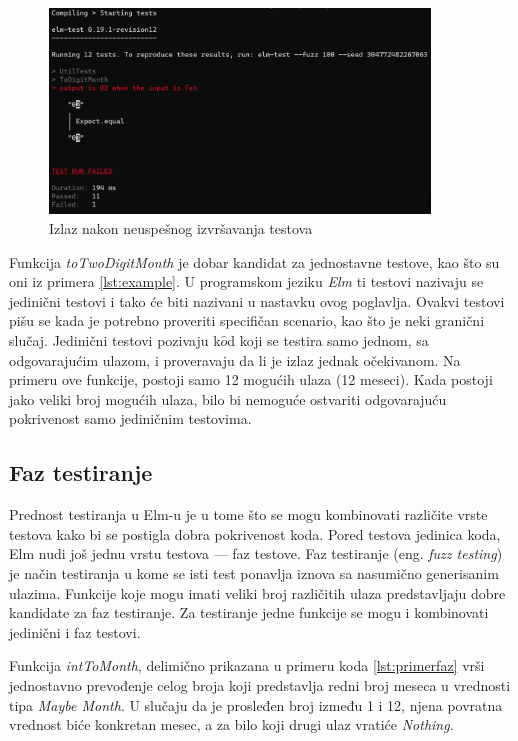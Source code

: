 \documentclass[12pt,oneside]{memoir}
\begin{document}
\begin{figure}[!ht]
  \centering
  \includegraphics[width=0.9\textwidth]{elmfail.png}
  \caption{Izlaz nakon neuspešnog izvršavanja testova}
  \label{fig:elmfail}
\end{figure}

\par Funkcija \emph{toTwoDigitMonth} je dobar kandidat za jednostavne testove, kao što su oni iz primera \ref{lst:example}. U programskom jeziku \emph{Elm} ti testovi nazivaju se jedinični testovi i tako će biti nazivani u nastavku ovog poglavlja. Ovakvi testovi pišu se kada je potrebno proveriti specifičan scenario, kao što je neki granični slučaj. Jedinični testovi pozivaju k$\hat{o}$d koji se testira samo jednom, sa odgovarajućim ulazom, i proveravaju da li je izlaz jednak očekivanom. Na primeru ove funkcije, postoji samo 12 mogućih ulaza (12 meseci). Kada postoji jako veliki broj mogućih ulaza, bilo bi nemoguće ostvariti odgovarajuću pokrivenost samo jediničnim testovima.

\subsection{Faz testiranje}
\par Prednost testiranja u Elm-u je u tome što se mogu kombinovati različite vrste testova kako bi se postigla dobra pokrivenost koda. Pored testova jedinica koda, Elm nudi još jednu vrstu testova --- faz testove. Faz testiranje (eng. \emph{fuzz testing}) je način testiranja u kome se isti test ponavlja iznova sa nasumično generisanim ulazima. Funkcije koje mogu imati veliki broj različitih ulaza predstavljaju dobre kandidate za faz testiranje. Za testiranje jedne funkcije se mogu i kombinovati jedinični i faz testovi.
\par Funkcija \emph{intToMonth}, delimično prikazana u primeru koda \ref{lst:primerfaz} vrši jednostavno prevođenje celog broja koji predstavlja redni broj meseca u vrednosti tipa \emph{Maybe Month}. U slučaju da je prosleđen broj između 1 i 12, njena povratna vrednost biće konkretan mesec, a za bilo koji drugi ulaz vratiće \emph{Nothing}.
\end{document}
